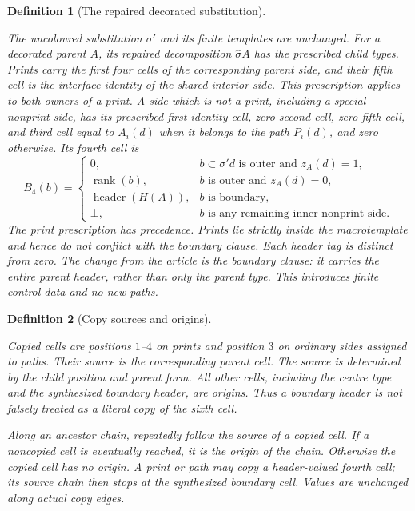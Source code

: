 \documentclass[11pt,a4paper]{article}
\newtheorem{definition}{Definition}[section]
\theoremstyle{remark}
\newcommand{\lean}[1]{}
\newcommand{\uses}[1]{}
\begin{document}
\begin{definition}[The repaired decorated substitution]
\label{def:control/substitution}
\lean{Tilings.Planned.headerSubstitution}
\uses{def:certificate,def:substitution,def:control/header}
The uncoloured substitution $\sigma'$ and its finite templates are unchanged.
For a decorated parent $A$, its repaired decomposition $\widehat\sigma A$
has the prescribed child types. Prints carry the first four cells of the
corresponding parent side, and their fifth cell is the interface identity of the
shared interior side. This prescription applies to \emph{both} owners of a
print. A side which is not a print, including a special nonprint side,
has its prescribed first identity cell, zero second
cell, zero fifth cell, and third cell equal to $A_i(d)$ when it belongs to
the path $P_i(d)$, and zero otherwise. Its fourth cell is
\[
 B_4(b)=
 \begin{cases}
  0,&b\subset\sigma'd\text{ is outer and }z_A(d)=1,\\
  \operatorname{rank}(b),&b\text{ is outer and }z_A(d)=0,\\
  \operatorname{header}(H(A)),&b\text{ is boundary},\\
  \bot,&b\text{ is any remaining inner nonprint side}.
 \end{cases}
\]
The print prescription has precedence. Prints lie strictly inside the
macrotemplate and hence do not conflict with the boundary clause. Each
header tag is distinct from zero. The change from the article is the
boundary clause: it carries the entire parent header, rather than only the
parent type. This introduces finite control data and no new paths.
\end{definition}

\begin{definition}[Copy sources and origins]
\label{def:control/origin}
\lean{Tilings.Planned.copySource}
\uses{def:control/substitution,def:certificate}
Copied cells are positions $1$--$4$ on prints and position $3$ on ordinary
sides assigned to paths. Their source is the corresponding parent cell.
The source is determined by the child position and parent form. All other
cells, including the centre type and the synthesized boundary header, are
origins. Thus a boundary header is \emph{not} falsely treated as a literal
copy of the sixth cell.

Along an ancestor chain, repeatedly follow the source of a copied cell.
If a noncopied cell is eventually reached, it is the origin of the chain.
Otherwise the copied cell has no origin. A print or path may copy a
header-valued fourth cell; its source chain then stops at the synthesized
boundary cell. Values are unchanged along actual copy edges.
\end{definition}
\end{document}

